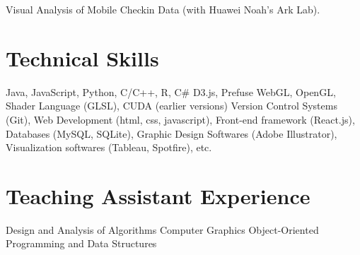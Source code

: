 \documentclass[10pt,a4paper,roman]{moderncv} %
\begin{document}
\vspace{0.2cm}

 {Visual Analysis of Mobile Checkin Data (with Huawei Noah's Ark Lab).}

\section{Technical Skills}

 {Java, JavaScript, Python, C/C++, R, C\#}
 {D3.js, Prefuse}
 {WebGL, OpenGL, Shader Language (GLSL), CUDA (earlier versions)}
 {Version Control Systems (Git), Web Development (html, css, javascript), Front-end framework (React.js), Databases (MySQL, SQLite), Graphic Design Softwares (Adobe Illustrator), Visualization softwares (Tableau, Spotfire), etc.}



\section{Teaching Assistant Experience}

 {Design and Analysis of Algorithms}
 {Computer Graphics}
 {Object-Oriented Programming and Data Structures}



\end{document}
